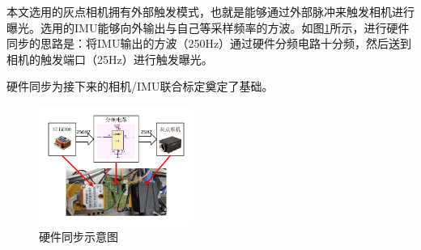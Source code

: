 本文选用的灰点相机拥有外部触发模式，也就是能够通过外部脉冲来触发相机进行曝光。选用的IMU能够向外输出与自己等采样频率的方波。如图\ref{fig2_15}所示，进行硬件同步的思路是：将IMU输出的方波（250Hz）通过硬件分频电路十分频，然后送到相机的触发端口（25Hz）进行触发曝光。

硬件同步为接下来的相机/IMU联合标定奠定了基础。
\begin{figure}[h]\setlength{\belowcaptionskip}{-12pt}
	\centering
	\includegraphics[width=0.45\textwidth]{figures/chapter2/fig2_15}
	\caption{硬件同步示意图}\label{fig2_15}
\end{figure}

